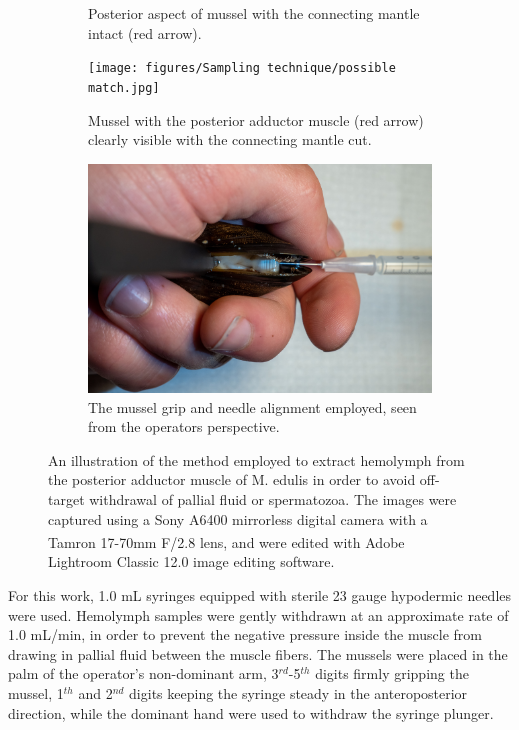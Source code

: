 \begin{figure}[H]
\begin{subfigure}[b]{.45\textwidth}
        \caption{Posterior aspect of mussel with the connecting mantle intact (red arrow).}
        \label{sfig:b}
    \end{subfigure}
    \newline
    \begin{subfigure}[b]{.45\textwidth}
        \centering
        \texttt{[image: figures/Sampling technique/possible match.jpg]}
        \caption{Mussel with the posterior adductor muscle (red arrow) clearly visible with the connecting mantle cut.}
        \label{sfig:c}
    \end{subfigure}
    \hfill
    \begin{subfigure}[b]{.45\textwidth}
        \centering
        \includegraphics[width=\textwidth]{figures/Sampling technique/hands colors centered.jpg}
        \caption{The mussel grip and needle alignment employed, seen from the operators perspective.}
        \label{sfig:d}
    \end{subfigure}
    \caption{An illustration of the method employed to extract hemolymph from the posterior adductor muscle of M. edulis in order to avoid off-target withdrawal of pallial fluid or spermatozoa. The images were captured using a Sony A6400 mirrorless digital camera with a Tamron 17-70mm F/2.8 lens, and were edited with Adobe\textsuperscript{\textregistered} Lightroom Classic 12.0 image editing software.}
    \label{fig:Hemolymph_sampling_illustration}
\end{figure}

For this work, 1.0 mL syringes equipped with sterile 23 gauge hypodermic needles were used. Hemolymph samples were gently withdrawn at an approximate rate of 1.0 mL/min, in order to prevent the negative pressure inside the muscle from drawing in pallial fluid between the muscle fibers. The mussels were placed in the palm of the operator's non-dominant arm, 3$^{rd}$-5$^{th}$ digits firmly gripping the mussel, 1$^{th}$ and 2$^{nd}$ digits keeping the syringe steady in the anteroposterior direction, while the dominant hand were used to withdraw the syringe plunger.

